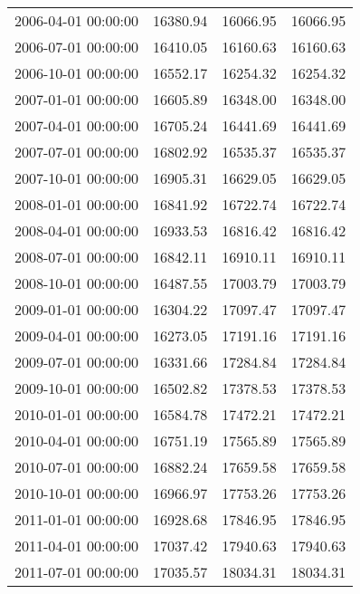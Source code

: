 \begin{table}[H]
\begin{tabular}{|c|c|c|c|}
        2006-04-01 00:00:00 & 16380.94     & 16066.95       & 16066.95        \\
        2006-07-01 00:00:00 & 16410.05     & 16160.63       & 16160.63        \\
        2006-10-01 00:00:00 & 16552.17     & 16254.32       & 16254.32        \\
        2007-01-01 00:00:00 & 16605.89     & 16348.00       & 16348.00        \\
        2007-04-01 00:00:00 & 16705.24     & 16441.69       & 16441.69        \\
        2007-07-01 00:00:00 & 16802.92     & 16535.37       & 16535.37        \\
        2007-10-01 00:00:00 & 16905.31     & 16629.05       & 16629.05        \\
        2008-01-01 00:00:00 & 16841.92     & 16722.74       & 16722.74        \\
        2008-04-01 00:00:00 & 16933.53     & 16816.42       & 16816.42        \\
        2008-07-01 00:00:00 & 16842.11     & 16910.11       & 16910.11        \\
        2008-10-01 00:00:00 & 16487.55     & 17003.79       & 17003.79        \\
        2009-01-01 00:00:00 & 16304.22     & 17097.47       & 17097.47        \\
        2009-04-01 00:00:00 & 16273.05     & 17191.16       & 17191.16        \\
        2009-07-01 00:00:00 & 16331.66     & 17284.84       & 17284.84        \\
        2009-10-01 00:00:00 & 16502.82     & 17378.53       & 17378.53        \\
        2010-01-01 00:00:00 & 16584.78     & 17472.21       & 17472.21        \\
        2010-04-01 00:00:00 & 16751.19     & 17565.89       & 17565.89        \\
        2010-07-01 00:00:00 & 16882.24     & 17659.58       & 17659.58        \\
        2010-10-01 00:00:00 & 16966.97     & 17753.26       & 17753.26        \\
        2011-01-01 00:00:00 & 16928.68     & 17846.95       & 17846.95        \\
        2011-04-01 00:00:00 & 17037.42     & 17940.63       & 17940.63        \\
        2011-07-01 00:00:00 & 17035.57     & 18034.31       & 18034.31        \\

\end{tabular}
\end{table}
